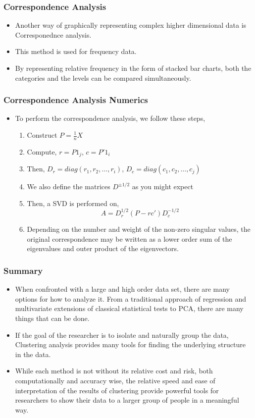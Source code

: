 \documentclass{beamer}
\begin{document}
\begin{frame}
\frametitle{Correspondence Analysis}
\begin{itemize}
\item Another way of graphically representing complex higher dimensional data is Corresponednce analysis.
\item This method is used for frequency data.
\item By representing relative frequency in the form of stacked bar charts, both the categories and the levels can be compared simultaneously.
\end{itemize}
\end{frame}

\begin{frame}
\frametitle{Correspondence Analysis Numerics}
\begin{itemize}
\item To perform the correspondence analysis, we follow these steps,
\begin{enumerate}
\item Construct $P=\frac{1}{n}X$
\item Compute, $r=P1_j$, $c=P'1_i$
\item Then, $D_r=diag(r_1,r_2,\ldots,r_i)$, $D_c=diag(c_1,c_2,\ldots,c_j)$
\item We also define the matrices $D^{\pm 1/2}$ as you might expect
\item Then, a SVD is performed on,
\[A=D^{1/2}_r(P-rc')D^{-1/2}_c\]
\item Depending on the number and weight of the non-zero singular values, the original correspondence may be written as a lower order sum of the eigenvalues and outer product of the eigenvectors.
\end{enumerate}
\end{itemize}
\end{frame}

\begin{frame}
\frametitle{Summary}
\begin{itemize}
\item When confronted with a large and high order data set, there are many options for how to analyze it. From a traditional approach of regression and multivariate extensions of classical statistical tests to PCA, there are many things that can be done.
\item If the goal of the researcher is to isolate and naturally group the data, Clustering analysis provides many tools for finding the underlying structure in the data.
\item While each method is not without its relative cost and risk, both computationally and accuracy wise, the relative speed and ease of interpretation of the results of clustering provide powerful tools for researchers to show their data to a larger group of people in a meaningful way.
\end{itemize}
\end{frame}
\end{document}
